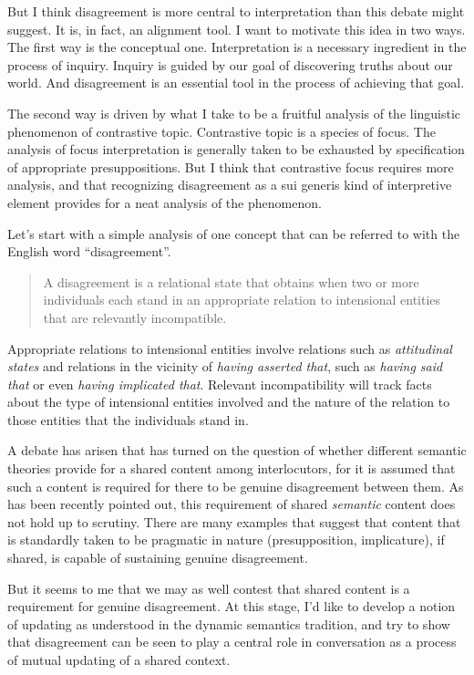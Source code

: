\documentclass[letterpaper,10pt]{article}
\begin{document}
But I think disagreement is more central to interpretation than this debate might suggest.  It is, in fact, an alignment tool.  I want to motivate this idea in two ways.  The first way is the conceptual one.  Interpretation is a necessary ingredient in the process of inquiry.  Inquiry is guided by our goal of discovering truths about our world.  And disagreement is an essential tool in the process of achieving that goal.

The second way is driven by what I take to be a fruitful analysis of the linguistic phenomenon of contrastive topic.  Contrastive topic is a species of focus.  The analysis of focus interpretation is generally taken to be exhausted by specification of appropriate presuppositions.  But I think that contrastive focus requires more analysis, and that recognizing disagreement as a sui generis kind of interpretive element provides for a neat analysis of the phenomenon.

Let's start with a simple analysis of one concept that can be referred to with the English word ``disagreement''. 

\begin{quotation}
  A disagreement is a relational state that obtains when two or more individuals each stand in an appropriate relation to intensional entities that are relevantly incompatible.
\end{quotation}

Appropriate relations to intensional entities involve relations such as \textit{attitudinal states} and relations in the vicinity of \textit{having asserted that}, such as \textit{having said that} or even \textit{having implicated that}.  Relevant incompatibility will track facts about the type of intensional entities involved and the nature of the relation to those entities that the individuals stand in.

A debate has arisen that has turned on the question of whether different semantic theories provide for a shared content among interlocutors, for it is assumed that such a content is required for there to be genuine disagreement between them.  As has been recently pointed out, this requirement of shared \textit{semantic} content does not hold up to scrutiny.  There are many examples that suggest that content that is standardly taken to be pragmatic in nature (presupposition, implicature), if shared, is capable of sustaining genuine disagreement.

But it seems to me that we may as well contest that shared content is a requirement for genuine disagreement.  At this stage, I'd like to develop a notion of updating as understood in the dynamic semantics tradition, and try to show that disagreement can be seen to play a central role in conversation as a process of mutual updating of a shared context.
\end{document}
